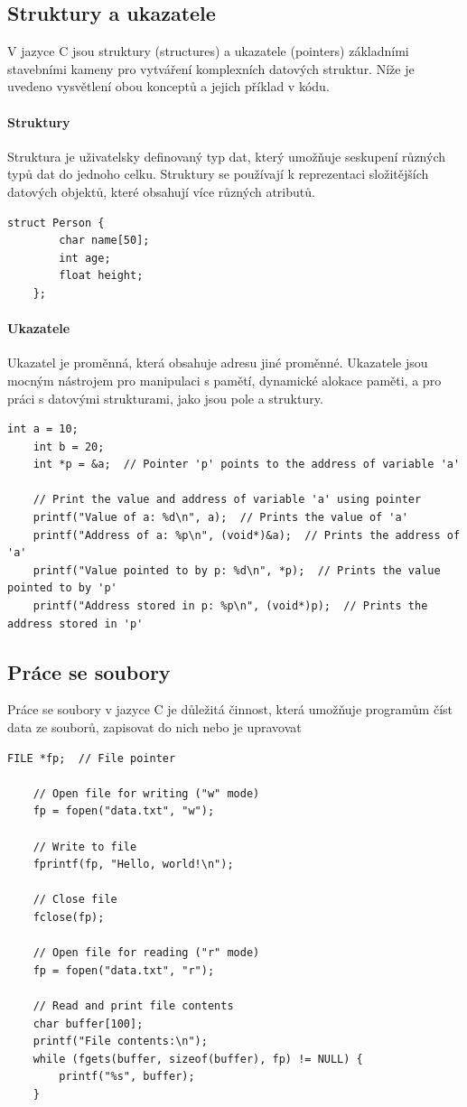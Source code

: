 \subsection{Struktury a ukazatele}
V jazyce C jsou struktury (structures) a ukazatele (pointers) základními stavebními kameny pro vytváření komplexních datových struktur. Níže je uvedeno vysvětlení obou konceptů a jejich příklad v kódu.
\paragraph{Struktury}
Struktura je uživatelsky definovaný typ dat, který umožňuje seskupení různých typů dat do jednoho celku. Struktury se používají k reprezentaci složitějších datových objektů, které obsahují více různých atributů.
\begin{lstlisting}[style=mystyle]
    struct Person {
        char name[50];
        int age;
        float height;
    };
\end{lstlisting}

\paragraph{Ukazatele}
Ukazatel je proměnná, která obsahuje adresu jiné proměnné. Ukazatele jsou mocným nástrojem pro manipulaci s pamětí, dynamické alokace paměti, a pro práci s datovými strukturami, jako jsou pole a struktury.
\begin{lstlisting}[style=mystyle]
    int a = 10;
    int b = 20;
    int *p = &a;  // Pointer 'p' points to the address of variable 'a'

    // Print the value and address of variable 'a' using pointer
    printf("Value of a: %d\n", a);  // Prints the value of 'a'
    printf("Address of a: %p\n", (void*)&a);  // Prints the address of 'a'
    printf("Value pointed to by p: %d\n", *p);  // Prints the value pointed to by 'p'
    printf("Address stored in p: %p\n", (void*)p);  // Prints the address stored in 'p'
\end{lstlisting}
\subsection{Práce se soubory}
Práce se soubory v jazyce C je důležitá činnost, která umožňuje programům číst data ze souborů, zapisovat do nich nebo je upravovat
\begin{lstlisting}[style=mystyle]
    FILE *fp;  // File pointer

    // Open file for writing ("w" mode)
    fp = fopen("data.txt", "w");

    // Write to file
    fprintf(fp, "Hello, world!\n");

    // Close file
    fclose(fp);

    // Open file for reading ("r" mode)
    fp = fopen("data.txt", "r");

    // Read and print file contents
    char buffer[100];
    printf("File contents:\n");
    while (fgets(buffer, sizeof(buffer), fp) != NULL) {
        printf("%s", buffer);
    }

\end{lstlisting}

